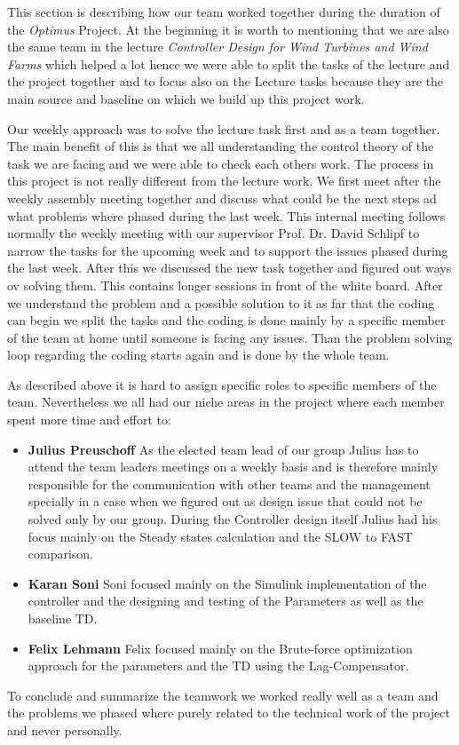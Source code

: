 This section is describing how our team worked together during the duration of the \textit{Optimus} Project. At the beginning it is worth to mentioning that we are also the same team in the lecture \textit{Controller Design for Wind	Turbines and Wind Farms} which helped a lot hence we were able to split the tasks of the lecture and the project together and to focus also on the Lecture tasks because they are the main source and baseline on which we build up this project work.

Our weekly approach was to solve the lecture task first and as a team together. The main benefit of this is that we all understanding the control theory of the task we are facing and we were able to check each others work. The process in this project is not really different from the lecture work. We first meet after the weekly assembly meeting together and discuss what could be the next steps ad what problems where phased during the last week. This internal meeting follows normally the weekly meeting with our supervisor Prof. Dr. David Schlipf to narrow the tasks for the upcoming week and to support the issues phased during the last week. After this we discussed the new task together and figured out ways ov solving them. This contains longer sessions in front of the white board. After we understand the problem and a possible solution to it as far that the coding can begin we split the tasks and the coding is done mainly by a specific member of the team at home until someone is facing any issues. Than the problem solving loop regarding the coding starts again and is done by the whole team. 

As described above it is hard to assign specific roles to specific members of the team. Nevertheless we all had our niche areas in the project where each member spent more time and effort to: 
\begin{itemize}
	\item \textbf{Julius Preuschoff} As the elected team lead of our group Julius has to attend the team leaders meetings on a weekly basis and is therefore mainly responsible for the communication with other teams and the management specially in a case when we figured out as design issue that could not be solved only by our group. During the Controller design itself Julius had his focus mainly on the Steady states calculation and the SLOW to FAST comparison.
	\item \textbf{Karan Soni} Soni focused mainly on the Simulink implementation of the controller and the designing and testing of the Parameters as well as the baseline TD.
	\item \textbf{Felix Lehmann} Felix focused mainly on the Brute-force optimization approach for the parameters and the TD using the Lag-Compensator.   
\end{itemize} 
 
 To conclude and summarize the teamwork we worked really well as a team and the problems we phased where purely related to the technical work of the project and never personally. 
 
   